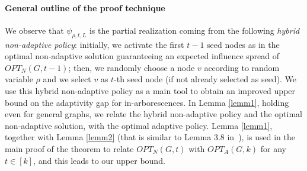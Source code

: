 \paragraph*{General outline of the proof technique} We observe that ${\psi}_{\rho,t,L}$ is the partial realization coming from the following  {\em hybrid non-adaptive policy}: initially, we activate the first $t-1$ seed nodes as in the optimal non-adaptive solution guaranteeing an expected influence spread of $OPT_N(G,t-1)$; then, we randomly choose a node $v$ according to random variable $\rho$ and we select $v$ as $t$-th seed node (if not already selected as seed). We use this hybrid non-adaptive policy as a main tool to obtain an improved upper bound on the adaptivity gap for in-arborescences. In Lemma \ref{lemm1}, holding even for general graphs, we relate the hybrid non-adaptive policy and the optimal non-adaptive solution, with the optimal adaptive policy. Lemma \ref{lemm1}, together with Lemma \ref{lemm2} (that is similar to Lemma 3.8 in~\cite{Chen2019}), is used in the main proof of the theorem to relate $OPT_N(G,t)$ with $OPT_A(G,k)$ for any $t\in [k]$, and this leads to our upper bound. 

